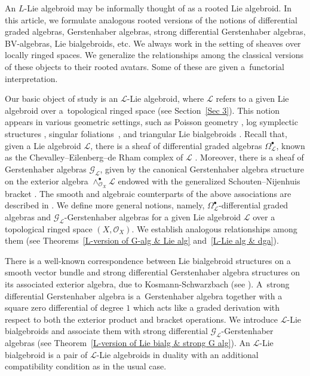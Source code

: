 \documentclass[pdftex]{sigma}
\numberwithin{equation}{section}
\theoremstyle{definition}
\begin{document}
An $L$-Lie algebroid may be informally thought of as a rooted Lie algebroid. In this article, we formulate analogous rooted versions of the notions of differential graded algebras, Gerstenhaber algebras, strong differential Gerstenhaber algebras,
BV-algebras, Lie bialgebroids, etc. We always work in the setting of sheaves over locally ringed spaces. We generalize the relationships among the classical versions of these objects to their rooted avatars. Some of these are given a~functorial interpretation.

Our basic object of study is an $\mathcal{L}$-Lie algebroid, where $\mathcal{L}$ refers to a given Lie algebroid over a~topological ringed space (see Section~\ref{Sec 3}). This notion appears in various geometric settings, such as Poisson geometry \cite{BP}, log symplectic structures \cite{RK}, singular foliations~\cite{CL}, and triangular Lie bialgebroids \cite{DC, KS}.
Recall that, given a Lie algebroid $\mathcal{L}$, there is a sheaf of differential graded algebras $\Omega^\bullet _\mathcal{L}$, known as the Chevalley--Eilenberg--de Rham complex of $\mathcal{L}$ \cite{UB, AS}. Moreover, there is a sheaf of Gerstenhaber algebras $\mathcal{G}_{\mathcal{L}}$, given by the canonical Gerstenhaber algebra structure on the exterior algebra $\wedge^\bullet_{\mathcal{O}_X} \mathcal{L}$ endowed with the generalized Schouten--Nijenhuis bracket \cite{CV, TS}.
The smooth and algebraic counterparts of the above associations are described in \cite{JH1, KS-M, PX}. We define more general notions, namely, $\Omega^\bullet _\mathcal{L}$-differential graded algebras and $\mathcal{G}_{\mathcal{L}}$-Gerstenhaber algebras for a given Lie algebroid $\mathcal{L}$ over a topological ringed space $(X, \mathcal{O}_X)$. We establish analogous relationships among them (see Theorems~\ref{L-version of G-alg & Lie alg} and~\ref{L-Lie alg & dga}).

There is a well-known correspondence between Lie bialgebroid structures on a smooth vector bundle and strong differential Gerstenhaber algebra structures on its associated exterior algebra, due to Kosmann-Schwarzbach (see \cite{JH1,KS, PX}). A~strong differential Gerstenhaber algebra is a~Gerstenhaber algebra together with a square zero differential of degree $1$ which acts like a graded derivation with respect to both the exterior product and bracket operations.
We introduce $\mathcal{L}$-Lie bialgebroids and associate them with strong differential $\mathcal{G}_{\mathcal{L}}$-Gerstenhaber algebras
(see Theorem~\ref{L-version of Lie bialg & strong G alg}). An $\mathcal{L}$-Lie bialgebroid is a pair of $\mathcal{L}$-Lie algebroids in duality with an additional compatibility condition as in the usual case.
\end{document}
